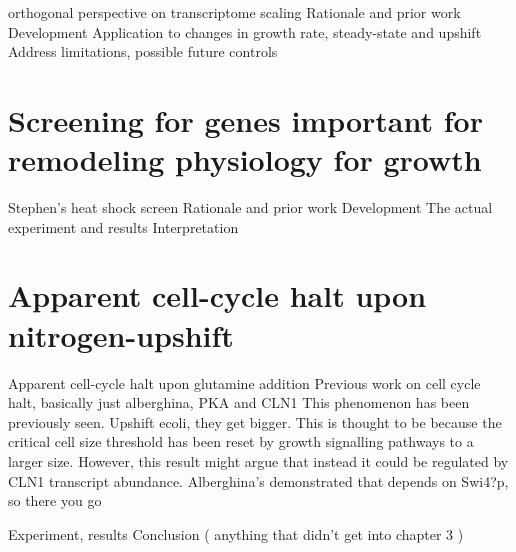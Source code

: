 


orthogonal perspective on transcriptome scaling 
Rationale and prior work 
Development 
Application to changes in growth rate, steady-state
and upshift 
Address limitations, possible future controls 

\section{Screening for genes important for remodeling physiology for
growth}

Stephen’s
heat shock screen Rationale and prior work Development The actual
experiment and results Interpretation 

\section{Apparent cell-cycle halt upon nitrogen-upshift}

Apparent cell-cycle halt upon
glutamine addition Previous work on cell cycle halt, basically just
alberghina, PKA and CLN1 This phenomenon has been previously seen.
Upshift ecoli, they get bigger.  This is thought to be because the
critical cell size threshold has been reset by growth signalling
pathways to a larger size. However, this result might argue that
instead it could be regulated by CLN1 transcript abundance.
Alberghina’s demonstrated that depends on Swi4?p, so there you go


Experiment, results Conclusion ( anything that didn’t get into chapter
3 )

